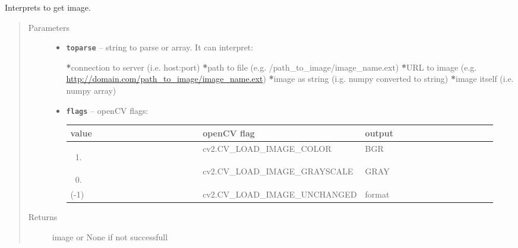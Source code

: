 \documentclass[letterpaper,10pt,english]{sphinxmanual}
\begin{document}

\begin{fulllineitems}
\label{RRtoolbox.lib:RRtoolbox.lib.image.interpretImage}
Interprets to get image.
\begin{quote}\begin{description}
\item[{Parameters}] \leavevmode\begin{itemize}
\item {} 
\textbf{\texttt{toparse}} -- 
string to parse or array. It can interpret:

{\color{red}\bfseries{}*}connection to server (i.e. host:port)
{\color{red}\bfseries{}*}path to file (e.g. /path\_to\_image/image\_name.ext)
{\color{red}\bfseries{}*}URL to image (e.g. \href{http://domain.com/path\_to\_image/image\_name.ext}{http://domain.com/path\_to\_image/image\_name.ext})
{\color{red}\bfseries{}*}image as string (i.g. numpy converted to string)
{\color{red}\bfseries{}*}image itself (i.e. numpy array)


\item {} 
\textbf{\texttt{flags}} -- 
openCV flags:

\begin{tabular}{|p{0.317\linewidth}|p{0.317\linewidth}|p{0.317\linewidth}|}
\hline
\textsf{\relax 
value
} & \textsf{\relax 
openCV flag
} & \textsf{\relax 
output
}\\
\hline\begin{enumerate}
\item {} 
\end{enumerate}
 & 
cv2.CV\_LOAD\_IMAGE\_COLOR
 & 
BGR
\\
\hline\begin{enumerate}
\setcounter{enumi}{-1}
\item {} 
\end{enumerate}
 & 
cv2.CV\_LOAD\_IMAGE\_GRAYSCALE
 & 
GRAY
\\
\hline
(-1)
 & 
cv2.CV\_LOAD\_IMAGE\_UNCHANGED
 & 
format
\\
\hline\end{tabular}



\end{itemize}

\item[{Returns}] \leavevmode
image or None if not successfull

\end{description}\end{quote}

\end{fulllineitems}
\end{document}

